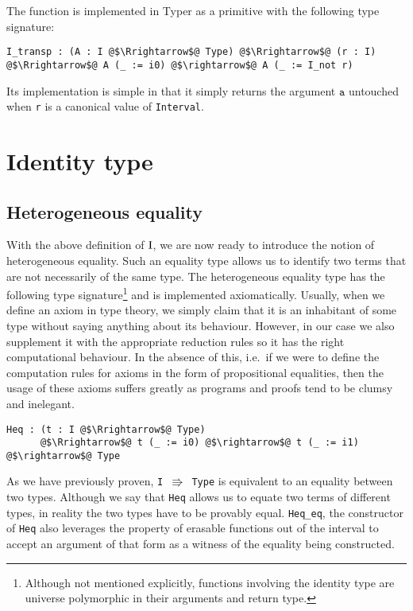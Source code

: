 \documentclass[12pt,twoside,maitrise]{dms}
\theoremstyle{definition}
\numberwithin{equation}{section}
\numberwithin{table}{chapter}
\numberwithin{figure}{chapter}
\newcommand\id[1] {\texttt{#1}}
\newcommand\fn[1] {\texttt{#1}}
\begin{document}
The function is implemented in Typer as a primitive with the following type
signature:

\begin{verbatim}
I_transp : (A : I @$\Rrightarrow$@ Type) @$\Rrightarrow$@ (r : I) @$\Rrightarrow$@ A (_ := i0) @$\rightarrow$@ A (_ := I_not r)
\end{verbatim}

Its implementation is simple in that it simply returns the argument $\id{a}$
untouched when \id{r} is a canonical value of \id{Interval}.

\section{Identity type}\label{sec:identity}

\subsection{Heterogeneous equality}
With the above definition of $\mathrm{I}$, we are now ready to introduce the notion of
heterogeneous equality. Such an equality type allows us to identify two terms
that are not necessarily of the same type. The heterogeneous equality type has
the following type signature\footnote{Although not mentioned explicitly,
functions involving the identity type are universe polymorphic in their
arguments and return type.} and is implemented axiomatically. Usually, when we
define an axiom in type theory, we simply claim that it is an inhabitant of some
type without saying anything about its behaviour. However, in our case we also
supplement it with the appropriate reduction rules so it has the right
computational behaviour. In the absence of this, i.e.\ if we were to define the
computation rules for axioms in the form of propositional equalities, then the
usage of these axioms suffers greatly as programs and proofs tend to be clumsy
and inelegant.

\begin{verbatim}
Heq : (t : I @$\Rrightarrow$@ Type)
      @$\Rrightarrow$@ t (_ := i0) @$\rightarrow$@ t (_ := i1) @$\rightarrow$@ Type
\end{verbatim}

As we have previously proven, \fn{I $\Rrightarrow$ Type} is equivalent to an
equality between two types. Although we say that \fn{Heq} allows us to equate
two terms of different types, in reality the two types have to be provably
equal. \id{Heq\_eq}, the constructor of \id{Heq} also leverages the property of
erasable functions out of the interval to accept an argument of that form as a
witness of the equality being constructed.
\end{document}
